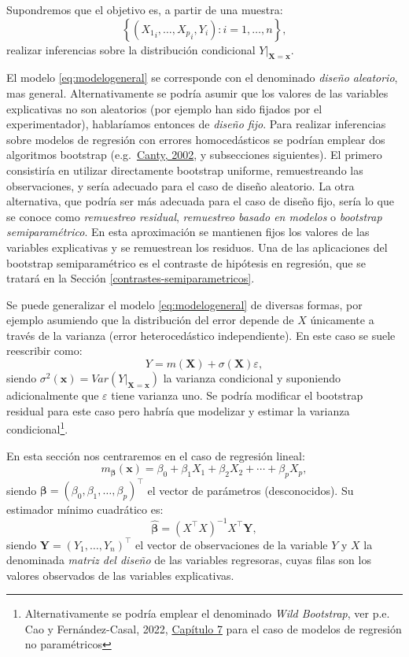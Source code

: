 \documentclass[
]{book}
\theoremstyle{break}
\theoremstyle{nonumberplain}
\begin{document}
Supondremos que el objetivo es, a partir de una muestra:
\[\left\{ \left( {X_1}_i, \ldots, {X_p}_i, Y_{i} \right)  : i = 1, \ldots, n \right\},\]
realizar inferencias sobre la distribución condicional
\(\left.Y \right\vert_{\mathbf{X}=\mathbf{x}}\).

El modelo \eqref{eq:modelogeneral} se corresponde con el denominado \emph{diseño aleatorio}, mas general.
Alternativamente se podría asumir que los valores de las variables explicativas no son aleatorios (por ejemplo han sido fijados por el experimentador), hablaríamos entonces de \emph{diseño fijo}.
Para realizar inferencias sobre modelos de regresión con errores homocedásticos se podrían emplear dos algoritmos bootstrap (e.g.~\href{http://cran.fhcrc.org/doc/Rnews/Rnews_2002-3.pdf}{Canty, 2002}, y subsecciones siguientes).
El primero consistiría en utilizar directamente bootstrap uniforme, remuestreando las observaciones, y sería adecuado para el caso de diseño aleatorio.
La otra alternativa, que podría ser más adecuada para el caso de diseño fijo, sería lo que se conoce como \emph{remuestreo residual}, \emph{remuestreo basado en modelos} o \emph{bootstrap semiparamétrico}.
En esta aproximación se mantienen fijos los valores de las variables explicativas y se remuestrean los residuos.
Una de las aplicaciones del bootstrap semiparamétrico es el contraste de hipótesis en regresión, que se tratará en la Sección \ref{contrastes-semiparametricos}.

Se puede generalizar el modelo \eqref{eq:modelogeneral} de diversas formas, por ejemplo asumiendo que la distribución del error depende de \(X\) únicamente a través de la varianza (error heterocedástico independiente).
En este caso se suele reescribir como:
\[Y = m(\mathbf{X}) + \sigma(\mathbf{X}) \varepsilon,\]
siendo \(\sigma^2(\mathbf{x}) = Var\left( \left. Y\right\vert_{\mathbf{X}=\mathbf{x}} \right)\) la varianza condicional y suponiendo adicionalmente que \(\varepsilon\) tiene varianza uno.
Se podría modificar el bootstrap residual para este caso pero habría que modelizar y estimar la varianza condicional\footnote{Alternativamente se podría emplear el denominado \emph{Wild Bootstrap}, ver p.e. Cao y Fernández-Casal, 2022, \href{https://rubenfcasal.github.io/book_remuestreo/m\%C3\%A9todos-de-remuestreo-en-regresi\%C3\%B3n-no-param\%C3\%A9trica.html\#wild-bootstrap}{Capítulo 7} para el caso de modelos de regresión no paramétricos}.

En esta sección nos centraremos en el caso de regresión lineal:
\[m_{\boldsymbol{\beta}}(\mathbf{x}) =  \beta_{0} + \beta_{1}X_{1} + \beta_{2}X_{2} + \cdots + \beta_{p}X_{p},\]
siendo \(\boldsymbol{\beta} = \left( \beta_{0}, \beta_{1}, \ldots, \beta_{p} \right)^{\top}\) el vector de parámetros (desconocidos).
Su estimador mínimo cuadrático es:
\[\boldsymbol{\hat{\beta}} = \left( X^{\top}X\right)^{-1}X^{\top}\mathbf{Y},\]
siendo \(\mathbf{Y} = \left( Y_{1}, \ldots, Y_{n} \right)^{\top}\) el vector de observaciones de la variable \(Y\) y \(X\) la denominada \emph{matriz del diseño} de las variables regresoras, cuyas filas son los valores observados de las variables explicativas.
\end{document}
